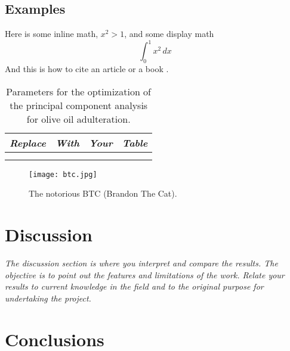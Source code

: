 \documentclass[11pt,a4paper,oneside]{report}
\newcommand{\instructions}[1]{{\color{orange}\itshape #1}}
\begin{document}
\instructions{
\section{Examples}

Here is some inline math, $x^2 > 1$, and some display math
\begin{equation}
  \int_0^1 x^2 \, dx
\end{equation}
And this is how to cite an article \cite{Zhang2021} or a book \cite{Axler2020}.

\begin{table}[htbp]
\centering
\begin{tabular}{@{}llll@{}}
\toprule
\emph{Replace} & \emph{With} & \emph{Your} & \emph{Table} \\
\midrule
& & & \\
& & & \\
\bottomrule
\end{tabular}
\caption{Parameters for the optimization of the principal component analysis for
olive oil adulteration.}
\label{tbl:2}  
\end{table}


\begin{figure}[htbp]
\centering
\texttt{[image: btc.jpg]}
\caption{The notorious BTC (Brandon The Cat).}
\label{fig:1}
\end{figure}
}




\chapter{Discussion}
\label{discussion}

\instructions{The discussion section is where you interpret and compare the
results. The objective is to point out the features and limitations of
the work. Relate your results to current knowledge in the field and to
the original purpose for undertaking the project.}




\chapter{Conclusions}
\label{conclusions}
\end{document}
